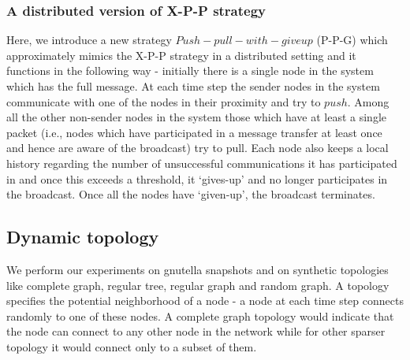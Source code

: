\subsubsection{A distributed version of X-P-P strategy}
Here, we introduce a new strategy $Push-pull-with-giveup$ (P-P-G) which approximately mimics 
the X-P-P strategy in a distributed setting  and it functions in the following way - 
initially there  is a single node in the system which has the full message. At each time step the sender nodes in the system communicate with one of the nodes 
in their proximity and try to $push$. Among all the other non-sender nodes in the system those which have at least a single packet (i.e., nodes which have participated 
in a message transfer at least once and hence are aware of the broadcast) try to pull. Each node also keeps a local history regarding the number of unsuccessful 
communications it has participated in and once this exceeds a threshold, it `gives-up' and no longer 
participates in the broadcast. Once all the nodes have `given-up', the broadcast terminates.


\subsection{Dynamic topology}
We perform our experiments on gnutella snapshots and on synthetic topologies like complete graph, regular tree, regular graph and random graph. 
A topology specifies the potential neighborhood of a node 
- a node at each time step connects randomly to one of these nodes. A complete graph 
topology would indicate that the 
node can connect to any other node in the network while for other sparser topology it would 
connect only to a subset of them.
